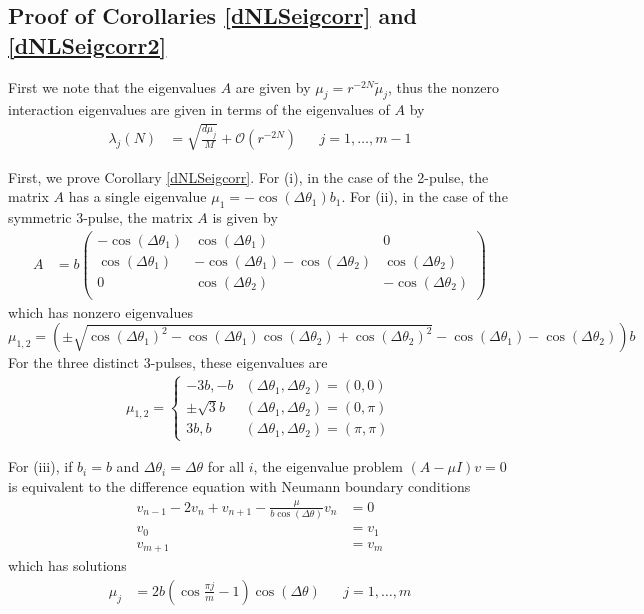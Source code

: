 \documentclass[12pt]{article}
\begin{document}
\subsection{Proof of Corollaries \ref{dNLSeigcorr} and \ref{dNLSeigcorr2}}

First we note that the eigenvalues $A$ are given by $\mu_j = r^{-2N}\tilde{\mu}_j$, thus the nonzero interaction eigenvalues are given in terms of the eigenvalues of $A$ by
\begin{align*}
\lambda_j(N) &= \sqrt{\frac{d \mu_j}{M}} + \mathcal{O}(r^{-2N}) && j = 1, \dots, m-1
\end{align*}

First, we prove Corollary \ref{dNLSeigcorr}. For (i), in the case of the 2-pulse, the matrix $A$ has a single eigenvalue $\mu_1 = -\cos(\Delta\theta_1) b_1$. For (ii), in the case of the symmetric 3-pulse, the matrix $A$ is given by
\begin{align*}
A &= b \begin{pmatrix}
-\cos(\Delta\theta_1) & \cos(\Delta\theta_1) & 0  \\
\cos(\Delta\theta_1) & -\cos(\Delta\theta_1) - \cos(\Delta\theta_2) & \cos(\Delta\theta_2) \\ 
0 & \cos(\Delta\theta_2) & -\cos(\Delta\theta_2) \\
\end{pmatrix}
\end{align*}
which has nonzero eigenvalues
\[
\mu_{1, 2} = \left( \pm\sqrt{\cos(\Delta\theta_1)^2 - \cos(\Delta\theta_1) \cos(\Delta\theta_2) + \cos(\Delta\theta_2)^2} - \cos(\Delta\theta_1) - \cos(\Delta\theta_2) \right)b
\]
For the three distinct 3-pulses, these eigenvalues are
\begin{align*}
\mu_{1, 2} = \begin{cases}
-3b, -b & (\Delta\theta_1, \Delta\theta_2) = (0, 0) \\
\pm \sqrt{3}b & (\Delta\theta_1, \Delta\theta_2) = (0, \pi) \\
3b, b & (\Delta\theta_1, \Delta\theta_2) = (\pi, \pi)
\end{cases}
\end{align*}

For (iii), if $b_i = b$ and $\Delta\theta_i = \Delta\theta$ for all $i$, the eigenvalue problem $(A - \mu I)v = 0$ is equivalent to the difference equation with Neumann boundary conditions
\begin{equation*}
\begin{aligned}
v_{n-1} - 2 v_n + v_{n+1} - \frac{\mu}{b \cos(\Delta\theta)} v_n &= 0 \\
v_0 &= v_1 \\
v_{m+1} &= v_m
\end{aligned}
\end{equation*}
which has solutions
\begin{align*}
\mu_j &= 2 b \left( \cos\frac{\pi j}{m} - 1 \right) \cos (\Delta\theta) && j = 1, \dots, m
\end{align*}
\end{document}
